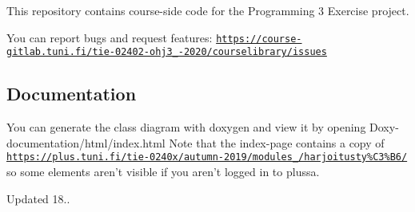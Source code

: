 This repository contains course-\/side code for the Programming 3 Exercise project.

You can report bugs and request features\-: \href{https://course-gitlab.tuni.fi/tie-02402-ohj3_2019-2020/courselibrary/issues}{\tt https\-://course-\/gitlab.\-tuni.\-fi/tie-\/02402-\/ohj3\-\_-\/2020/courselibrary/issues}

\subsection*{Documentation}

You can generate the class diagram with doxygen and view it by opening Doxy-\/documentation/html/index.\-html Note that the index-\/page contains a copy of \href{https://plus.tuni.fi/tie-0240x/autumn-2019/modules_00/harjoitusty%C3%B6/}{\tt https\-://plus.\-tuni.\-fi/tie-\/0240x/autumn-\/2019/modules\-\_\-00/harjoitusty\%\-C3\%\-B6/} so some elements aren't visible if you aren't logged in to plussa.

Updated 18.. 
